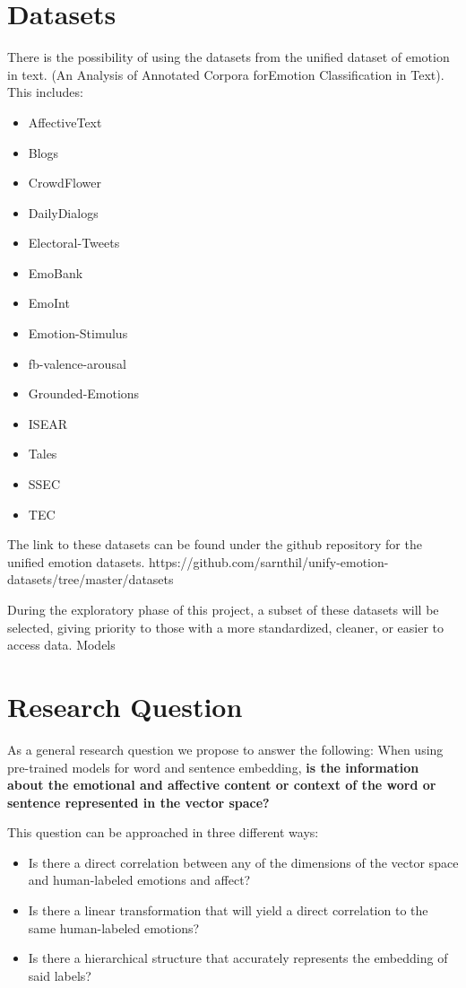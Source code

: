 \section{Datasets}\label{sec:Datasets}
There is the possibility of using the datasets from the unified dataset of emotion in text. (An Analysis of Annotated Corpora forEmotion Classification in Text). This includes:
\begin{itemize}
  \item AffectiveText
  \item Blogs
  \item CrowdFlower
  \item DailyDialogs
  \item Electoral-Tweets
  \item EmoBank
  \item EmoInt
  \item Emotion-Stimulus
  \item fb-valence-arousal
  \item Grounded-Emotions
  \item ISEAR
  \item Tales
  \item SSEC
  \item TEC
\end{itemize}


The link to these datasets can be found under the github repository for the unified emotion datasets.
https://github.com/sarnthil/unify-emotion-datasets/tree/master/datasets

During the exploratory phase of this project, a subset of these datasets will be selected, giving priority to those with a more standardized, cleaner, or easier to access data.
Models

\section{Research Question}\label{sec:Research Question}

As a general research question we propose to answer the following:
When using pre-trained models for word and sentence embedding, \textbf{is the information about the emotional and affective content or context of the word or sentence represented in the vector space?}

This question can be approached in three different ways:
\begin{itemize}
  \item Is there a direct correlation between any of the dimensions of the vector space and human-labeled emotions and affect?
  \item Is there a linear transformation that will yield a direct correlation to the same human-labeled emotions?
  \item Is there a hierarchical structure that accurately represents the embedding of said labels?
\end{itemize}
